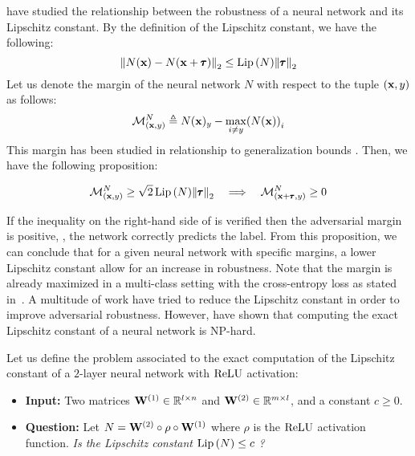 \citet{tsuzuku2018lipschitz} have studied the relationship between the robustness of a neural network and its Lipschitz constant. 
By the definition of the Lipschitz constant, we have the following:
\begin{equation}
  \norm{N(\mathbf{x}) - N(\mathbf{x} + \pmb{\tau})}_2 \leq \operatorname{Lip}{(N)} \norm{\pmb{\tau}}_2
\end{equation}
Let us denote the margin of the neural network $N$ with respect to the tuple $(\mathbf{x}, y)$ as follows:
\begin{equation}
  \mathcal{M}^{N}_{(\xvec, y)} \triangleq N(\xvec)_y - \max_{i \neq y} \left( N(\xvec) \right)_i
\end{equation}
This margin has been studied in relationship to generalization bounds \cite{langford2002pac,bartlett2017spectrally,neyshabur2018pacbayesian}.
Then, we have the following proposition:
\begin{proposition}
  \begin{equation}
    \mathcal{M}^{N}_{(\mathbf{x}, y)} \geq \sqrt{2} \operatorname{Lip}{(N)} \norm{\pmb{\tau}}_2 \quad \Longrightarrow \quad \mathcal{M}^{N}_{(\mathbf{x} + \pmb{\tau}, y)} \geq 0
    \label{equation:ch3-margin_guarded_area}
  \end{equation}
  \removespace
\end{proposition}
\noindent
If the inequality on the right-hand side of  is verified then the adversarial margin is positive, \ie, the network correctly predicts the label. 
From this proposition, we can conclude that for a given neural network with specific margins, a lower Lipschitz constant allow for an increase in robustness. 
Note that the margin is already maximized in a multi-class setting with the cross-entropy loss as stated in~\citet{hein2017formal}.
A multitude of work have tried to reduce the Lipschitz constant in order to improve adversarial robustness.
However, \citet{scaman2018lipschitz} have shown that computing the exact Lipschitz constant of a neural network is NP-hard.

\begin{problem}
  Let us define the problem associated to the exact computation of the Lipschitz constant of a $2$-layer neural network with $\operatorname{ReLU}$ activation:
  \begin{itemize}[topsep=0pt,noitemsep]
    \item[] \textbf{Input:} Two matrices $\mathbf{W}^{(1)} \in \mathbb{R}^{l \times n}$ and $\mathbf{W}^{(2)} \in \mathbb{R}^{m \times l}$, and a constant $c \geq 0$.
    \item[] \textbf{Question:} Let $N = \mathbf{W}^{(2)} \circ \rho \circ \mathbf{W}^{(1)}$ where $\rho$ is the $\operatorname{ReLU}$ activation function. \emph{Is the Lipschitz constant $\operatorname{Lip}{(N)} \leq c$ ?}
  \end{itemize}
  \label{problem:ch3-lipschitz_computation}
\end{problem}


